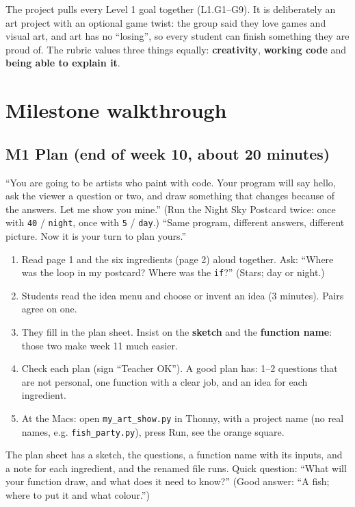 \documentclass[level=1,teacher]{kidscode}
\begin{document}
\begin{teachernote}
The project pulls every Level 1 goal together (L1.G1--G9). It is deliberately an art project with
an optional game twist: the group said they love games and visual art, and art has no
\enquote{losing}, so every student can finish something they are proud of. The rubric values three
things equally: \textbf{creativity}, \textbf{working code} and \textbf{being able to explain it}.
\end{teachernote}

\section{Milestone walkthrough}

\subsection{M1 Plan (end of week 10, about 20 minutes)}
\begin{teacherscript}
\enquote{You are going to be artists who paint with code. Your program will say hello, ask the
viewer a question or two, and draw something that changes because of the answers. Let me show
you mine.} (Run the Night Sky Postcard twice: once with \texttt{40} / \texttt{night}, once with
\texttt{5} / \texttt{day}.) \enquote{Same program, different answers, different picture. Now it is
your turn to plan yours.}
\end{teacherscript}
\begin{enumerate}[itemsep=2pt]
  \item Read page 1 and the six ingredients (page 2) aloud together. Ask: \enquote{Where was the
        loop in my postcard? Where was the \texttt{if}?} (Stars; day or night.)
  \item Students read the idea menu and choose or invent an idea (3 minutes). Pairs agree on one.
  \item They fill in the plan sheet. Insist on the \textbf{sketch} and the \textbf{function name}:
        those two make week 11 much easier.
  \item Check each plan (sign \enquote{Teacher OK}). A good plan has: 1--2 questions that are not
        personal, one function with a clear job, and an idea for each ingredient.
  \item At the Macs: open \texttt{my\_art\_show.py} in Thonny,  with a project
        name (no real names, e.g. \texttt{fish\_party.py}), press Run, see the orange square.
\end{enumerate}
\begin{formativecheck}
The plan sheet has a sketch, the questions, a function name with its inputs, and a note for each
ingredient, and the renamed file runs. Quick question: \enquote{What will your function draw, and
what does it need to know?} (Good answer: \enquote{A fish; where to put it and what colour.})
\end{formativecheck}
\end{document}
